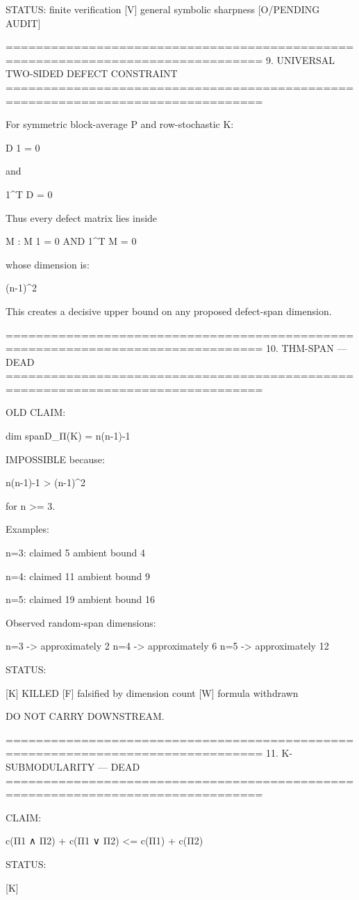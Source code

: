 STATUS:
finite verification [V]
general symbolic sharpness [O/PENDING AUDIT]

================================================================================
9. UNIVERSAL TWO-SIDED DEFECT CONSTRAINT
================================================================================

For symmetric block-average P and row-stochastic K:

D 1 = 0

and

1^T D = 0

Thus every defect matrix lies inside

{ M :
  M 1 = 0
  AND
  1^T M = 0
}

whose dimension is:

(n-1)^2

This creates a decisive upper bound on any proposed defect-span dimension.

================================================================================
10. THM-SPAN — DEAD
================================================================================

OLD CLAIM:

dim span{D_Π(K)}
=
n(n-1)-1

IMPOSSIBLE because:

n(n-1)-1 > (n-1)^2

for n >= 3.

Examples:

n=3:
claimed 5
ambient bound 4

n=4:
claimed 11
ambient bound 9

n=5:
claimed 19
ambient bound 16

Observed random-span dimensions:

n=3 -> approximately 2
n=4 -> approximately 6
n=5 -> approximately 12

STATUS:

[K] KILLED
[F] falsified by dimension count
[W] formula withdrawn

DO NOT CARRY DOWNSTREAM.

================================================================================
11. K-SUBMODULARITY — DEAD
================================================================================

CLAIM:

c(Π1 ∧ Π2) + c(Π1 ∨ Π2)
<=
c(Π1) + c(Π2)

STATUS:

[K]

